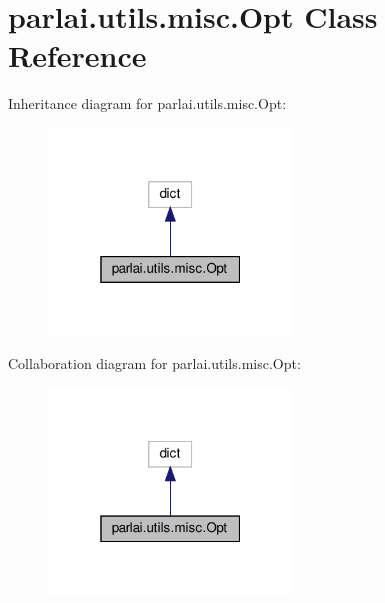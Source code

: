 \hypertarget{classparlai_1_1utils_1_1misc_1_1Opt}{}\section{parlai.\+utils.\+misc.\+Opt Class Reference}
\label{classparlai_1_1utils_1_1misc_1_1Opt}


Inheritance diagram for parlai.\+utils.\+misc.\+Opt\+:
\nopagebreak
\begin{figure}[H]
\begin{center}
\leavevmode
\includegraphics[width=184pt]{d1/da3/classparlai_1_1utils_1_1misc_1_1Opt__inherit__graph}
\end{center}
\end{figure}


Collaboration diagram for parlai.\+utils.\+misc.\+Opt\+:
\nopagebreak
\begin{figure}[H]
\begin{center}
\leavevmode
\includegraphics[width=184pt]{d7/dbe/classparlai_1_1utils_1_1misc_1_1Opt__coll__graph}
\end{center}
\end{figure}
